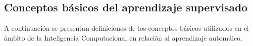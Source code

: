 %
%
\subsection{Conceptos básicos del aprendizaje supervisado}
%
A continuación se presentan definiciones de los conceptos básicos
utilizados en el ámbito de la Inteligencia Computacional en relación
al aprendizaje automáico.
